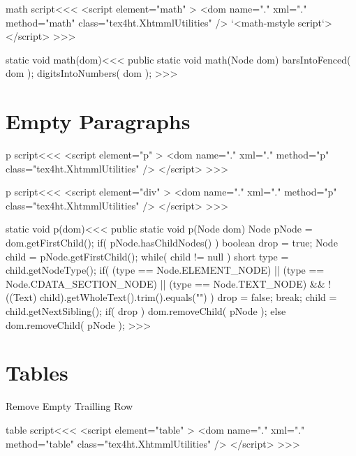 \documentclass{article}
\begin{document}
\<math script\><<<
<script element="math" >
   <dom name="." xml="." method="math" class="tex4ht.XhtmmlUtilities" />
   `<math-mstyle script`>
</script> 
>>>




\<static void math(dom)\><<<
public static void math(Node dom) {
   barsIntoFenced( dom );
   digitsIntoNumbers( dom );
}
>>>












\section{Empty Paragraphs}

\<p script\><<<
<script element="p" >
   <dom name="." xml="." method="p" class="tex4ht.XhtmmlUtilities" />
</script> 
>>>

\<p script\><<<
<script element="div" >
   <dom name="." xml="." method="p" class="tex4ht.XhtmmlUtilities" />
</script> 
>>>


\<static void p(dom)\><<<
public static void p(Node dom) {
   Node pNode = dom.getFirstChild();
   if( pNode.hasChildNodes() ){
      boolean drop = true;
      Node child = pNode.getFirstChild();
      while( child != null ){
         short type = child.getNodeType();
         if(              
             (type == Node.ELEMENT_NODE)
           ||             
             (type == Node.CDATA_SECTION_NODE)
           ||             
             (type == Node.TEXT_NODE)
           &&
             !((Text) child).getWholeText().trim().equals("")  
         ){         
            drop = false; break;
         }
         child = child.getNextSibling();
      }
      if( drop ){
         dom.removeChild( pNode );
      }        
   } else {
      dom.removeChild( pNode );
   }
}
>>>



\section{Tables}


Remove Empty Trailling Row

\<table script\><<<
<script element="table" >
   <dom name="." xml="." method="table" class="tex4ht.XhtmmlUtilities" />
</script> 
>>>
\end{document}
